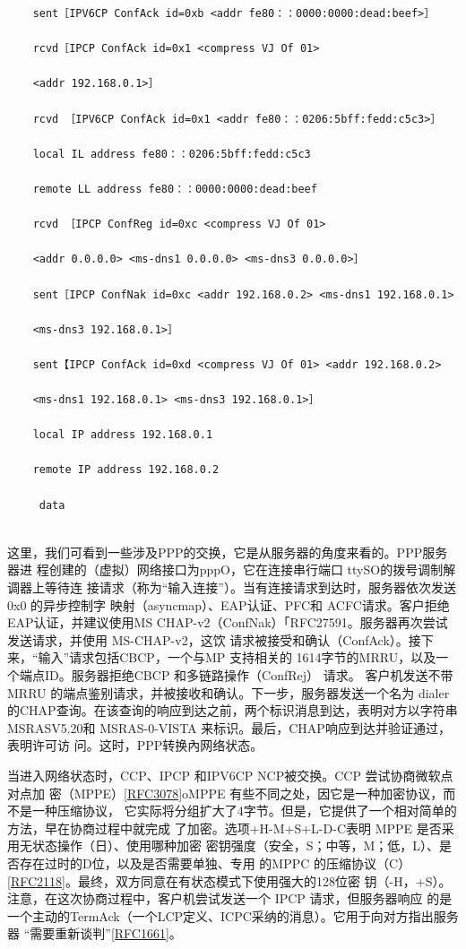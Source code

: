 \begin{verbatim}
    sent［IPV6CP ConfAck id=0xb <addr fe80：：0000:0000:dead:beef>］

    rcvd［IPCP ConfAck id=0x1 <compress VJ Of 01>

    <addr 192.168.0.1>］

    rcvd ［IPV6CP ConfAck id=0x1 <addr fe80：：0206:5bff:fedd:c5c3>］

    local IL address fe80：：0206:5bff:fedd:c5c3

    remote LL address fe80：：0000:0000:dead:beef

    rcvd ［IPCP ConfReg id=0xc <compress VJ Of 01>

    <addr 0.0.0.0> <ms-dns1 0.0.0.0> <ms-dns3 0.0.0.0>］

    sent［IPCP ConfNak id=0xc <addr 192.168.0.2> <ms-dns1 192.168.0.1>

    <ms-dns3 192.168.0.1>］

    sent【IPCP ConfAck id=0xd <compress VJ Of 01> <addr 192.168.0.2>

    <ms-dns1 192.168.0.1> <ms-dns3 192.168.0.1>］

    local IP address 192.168.0.1

    remote IP address 192.168.0.2

     data


\end{verbatim}

这里，我们可看到一些涉及PPP的交换，它是从服务器的角度来看的。PPP服务器进
程创建的（虚拟）网络接口为pppO，它在连接串行端口 ttySO的拨号调制解调器上等待连
接请求（称为“输入连接”）。当有连接请求到达时，服务器依次发送0x0 的异步控制字
映射（asyncmap）、EAP认证、PFC和 ACFC请求。客户拒绝EAP认证，并建议使用MS
CHAP-v2（ConfNak）「RFC27591。服务器再次尝试发送请求，并使用 MS-CHAP-v2，这饮
请求被接受和确认（ConfAck）。接下来，“输入”请求包括CBCP，一个与MP 支持相关的
1614字节的MRRU，以及一个端点ID。服务器拒绝CBCP 和多链路操作（ConfRej） 请求。
客户机发送不带MRRU 的端点鉴别请求，并被接收和确认。下一步，服务器发送一个名为
dialer 的CHAP查询。在该查询的响应到达之前，两个标识消息到达，表明对方以字符串
MSRASV5.20和 MSRAS-0-VISTA 来标识。最后，CHAP响应到达并验证通过，表明许可访
问。这时，PPP转换內网络状态。

当进入网络状态时，CCP、IPCP 和IPV6CP NCP被交换。CCP 尝试协商微软点对点加
密（MPPE）\href{https://www.rfc-editor.org/rfc/rfc3078}{[RFC3078]}oMPPE
有些不同之处，因它是一种加密协议，而不是一种压缩协议，
它实际将分组扩大了4字节。但是，它提供了一个相对简单的方法，早在协商过程中就完成
了加密。选项+H-M+S+L-D-C表明 MPPE 是否采用无状态操作（日）、使用哪种加密
密钥强度（安全，S；中等，M；低，L）、是否存在过时的D位，以及是否需要单独、专用
的MPPC
的压缩协议（C）\href{https://www.rfc-editor.org/rfc/rfc2118}{[RFC2118]}。最终，双方同意在有状态模式下使用强大的128位密
钥（-H，+S）。注意，在这次协商过程中，客户机尝试发送一个 IPCP 请求，但服务器响应
的是一个主动的TermAck（一个LCP定义、ICPC采纳的消息）。它用于向对方指出服务器
“需要重新谈判”\href{https://www.rfc-editor.org/rfc/rfc1661}{[RFC1661]}。

